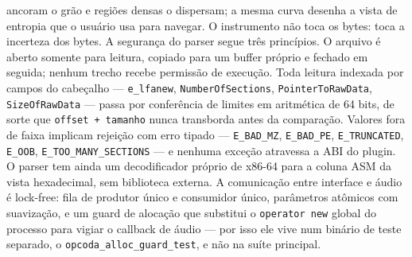 \documentclass[11pt,a4paper]{article}
\newcommand{\code}[1]{\texttt{\small #1}}
\begin{document}
ancoram o grão e regiões densas o dispersam; a mesma curva desenha a vista de entropia que o usuário usa para navegar. O instrumento não toca os bytes: toca a incerteza dos bytes. A segurança do parser segue três princípios. O arquivo é aberto somente para leitura, copiado para um buffer próprio e fechado em seguida; nenhum trecho recebe permissão de execução. Toda leitura indexada por campos do cabeçalho --- \code{e\_lfanew}, \code{NumberOfSections}, \code{PointerToRawData}, \code{SizeOfRawData} --- passa por conferência de limites em aritmética de 64 bits, de sorte que \code{offset + tamanho} nunca transborda antes da comparação. Valores fora de faixa implicam rejeição com erro tipado --- \code{E\_BAD\_MZ}, \code{E\_BAD\_PE}, \code{E\_TRUNCATED}, \code{E\_OOB}, \code{E\_TOO\_MANY\_SECTIONS} --- e nenhuma exceção atravessa a ABI do plugin. O parser tem ainda um decodificador próprio de x86-64 para a coluna ASM da vista hexadecimal, sem biblioteca externa. A comunicação entre interface e áudio é lock-free: fila de produtor único e consumidor único, parâmetros atômicos com suavização, e um guard de alocação que substitui o \code{operator new} global do processo para vigiar o callback de áudio --- por isso ele vive num binário de teste separado, o \code{opcoda\_alloc\_guard\_test}, e não na suíte principal.
\end{document}
